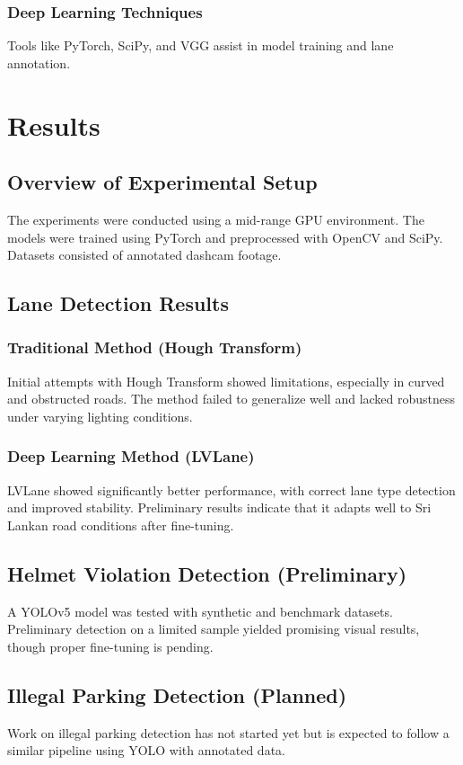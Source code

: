\documentclass[12pt,a4paper]{article}
\begin{document}
\subsubsection{Deep Learning Techniques}
Tools like PyTorch, SciPy, and VGG assist in model training and lane annotation.

\section{Results}

\subsection{Overview of Experimental Setup}
The experiments were conducted using a mid-range GPU environment. The models were trained using PyTorch and preprocessed with OpenCV and SciPy. Datasets consisted of annotated dashcam footage.

\subsection{Lane Detection Results}

\subsubsection{Traditional Method (Hough Transform)}
Initial attempts with Hough Transform showed limitations, especially in curved and obstructed roads. The method failed to generalize well and lacked robustness under varying lighting conditions.

\subsubsection{Deep Learning Method (LVLane)}
LVLane showed significantly better performance, with correct lane type detection and improved stability. Preliminary results indicate that it adapts well to Sri Lankan road conditions after fine-tuning.

\subsection{Helmet Violation Detection (Preliminary)}
A YOLOv5 model was tested with synthetic and benchmark datasets. Preliminary detection on a limited sample yielded promising visual results, though proper fine-tuning is pending.

\subsection{Illegal Parking Detection (Planned)}
Work on illegal parking detection has not started yet but is expected to follow a similar pipeline using YOLO with annotated data.
\end{document}
